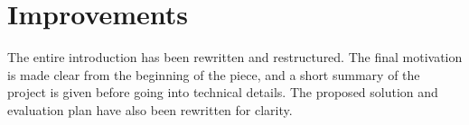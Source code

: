 
\section{Improvements}\label{improvements}
The entire introduction has been rewritten and restructured. The final motivation is made clear from the beginning of the piece, and a short summary of the project is given before going into technical details. The proposed solution and evaluation plan have also been rewritten for clarity.
